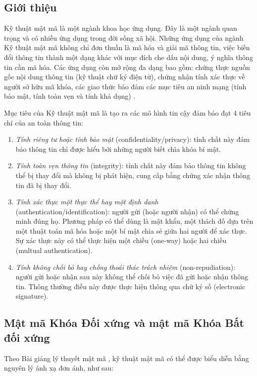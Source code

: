 \subsection{Giới thiệu}
Kỹ thuật mật mã là một ngành khoa học ứng dụng. Đây là một ngành quan trọng và có nhiều ứng dụng trong đời sống xã hội. Những ứng dụng của ngành Kỹ thuật mật mã không chỉ đơn thuần là mã hóa và giải mã thông tin, việc biến đổi thông tin thành một dạng khác với mục đích che dấu nội dung, ý nghĩa thông tin cần mã hóa. Các ứng dụng còn mở rộng đa dạng bao gồm: chứng thực nguồn gốc nội dung thông tin (kỹ thuật chữ ký điện tử), chứng nhận tính xác thực về người sở hữu mã khóa, các giao thức bảo đảm các mục tiêu an ninh mạng (tính bảo mật, tính toàn vẹn và tính khả dụng) \cite{dothanhnghi2018}.

Mục tiêu của Kỹ thuật mật mã là tạo ra các mô hình tin cậy đảm bảo đạt 4 tiêu chí của an toàn thông tin:

\begin{enumerate}

\item  \emph{Tính riêng tư hoặc tính bảo mật} (confidentiality/privacy): tính chất này đảm bảo thông tin chỉ được hiểu bởi những người biết chìa khóa bí mật.
\item \emph{Tính toàn vẹn thông tin} (integrity): tính chất này đảm bảo thông tin không thể bị thay đổi mà không bị phát hiện, cung cấp bằng chứng xác nhận thông tin đã bị thay đổi.
\item \emph{Tính xác thực một thực thể hay một định danh} (authentication/identification): người gửi (hoặc người nhận) có thể chứng minh đúng họ. Phương pháp có thể dùng là mật khẩu, một thách đố dựa trên một thuật toán mã hóa hoặc một bí mật chia sẻ giữa hai người để xác thực. Sự xác thực này có thể thực hiện một chiều (one-way) hoặc hai chiều (multual authentication).
\item \emph{Tính không chối bỏ hay chống thoái thác trách nhiệm} (non-repudiation): người gửi hoặc nhận sau này không thể chối bỏ việc đã gửi hoặc nhận thông tin. Thông thường điều này được thực hiện thông qua chữ ký số (electronic signature).

\end{enumerate}

\subsection{Mật mã Khóa Đối xứng và mật mã Khóa Bất đối xứng}

Theo Bài giảng lý thuyết mật mã \cite{lequyetthang2016}, kỹ thuật mật mã có thể được biểu diễn bằng nguyên lý ánh xạ đơn ánh, như sau:

